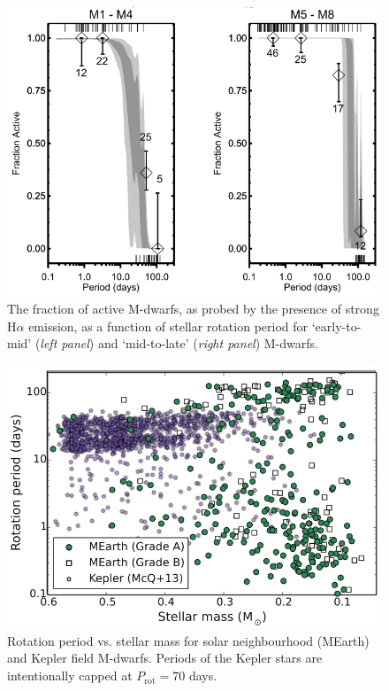 \begin{figure}
\centering
\includegraphics[scale=.5]{figures/mdwarfactivity.png}
\caption{The fraction of active M-dwarfs, as probed by the presence of strong H$\alpha$ 
emission, as a function of stellar rotation period for `early-to-mid' (\emph{left panel}) and 
`mid-to-late' (\emph{right panel}) M-dwarfs. 
\parencite[Image credit:][]{west15} \label{fig:activity}}
\end{figure}

\begin{figure}
\centering
\includegraphics[scale=.5]{figures/mdwarfrotation.png}
\caption{Rotation period vs. stellar mass for solar neighbourhood (MEarth) and Kepler field 
M-dwarfs. Periods of the Kepler stars are intentionally capped at $P_{\mathrm{rot}}=70$ days. 
\parencite[Image credit:][]{newton16a} \label{fig:rotation}}
\end{figure}

